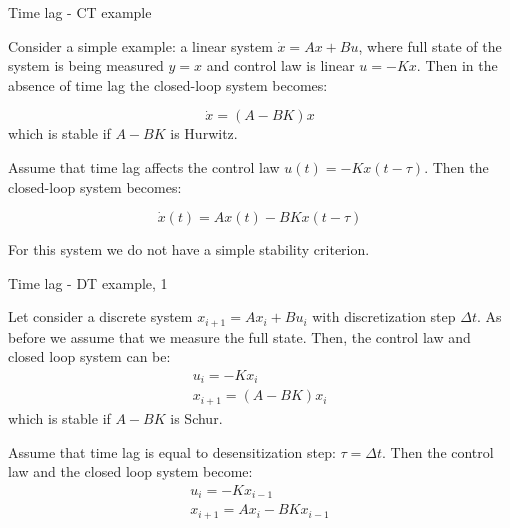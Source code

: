 \documentclass{beamer}
\begin{document}
\begin{frame}{Time lag - CT example}
	\begin{flushleft}
		
		Consider a simple example: a linear system $\dot x = A x + Bu$, where full state of the system is being measured $y = x$ and control law is linear $u = -Kx$. Then in the absence of time lag the closed-loop system becomes:
		
		\begin{equation}
			\dot x = (A - BK )x
		\end{equation}
		which is stable if $A - BK$ is Hurwitz.
		
		\bigskip
		
		Assume that time lag affects the control law $u(t) = -Kx(t - \tau)$. Then the closed-loop system becomes:
		
		\begin{equation}
			\dot x(t) = A x(t) - B K x(t - \tau)
		\end{equation}
		
		For this system we do not have a simple stability criterion. 
		
	\end{flushleft}
\end{frame}





\begin{frame}{Time lag - DT example, 1}
	\begin{flushleft}
		
		Let consider a discrete system $x_{i+1} = A x_i + Bu_i$ with discretization step $\Delta t$. As before we assume that we measure the full state. Then, the control law and closed loop system can be:
		\begin{align}
			u_i = -K x_i \\
			x_{i+1} = (A - BK) x_i
		\end{align}
		which is stable if $A - BK$ is Schur.
		
		\bigskip
		
		Assume that time lag is equal to desensitization step: $\tau = \Delta t$. Then the control law and the closed loop system become:
		\begin{align}
			u_i = -K x_{i-1} \\
			x_{i+1} =A x_i - BKx_{i-1}
		\end{align}
		
		
	\end{flushleft}
\end{frame}
\end{document}
